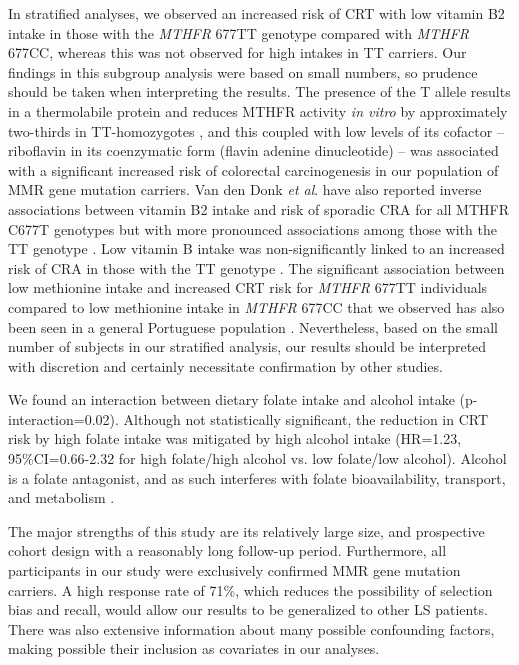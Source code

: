 \noindent In stratified analyses, we observed an increased risk of CRT with low vitamin B2 intake in those with the \emph{MTHFR} 677TT genotype compared with \emph{MTHFR} 677CC, whereas this was not observed for high intakes in TT carriers. Our findings in this subgroup analysis were based on small numbers, so prudence should be taken when interpreting the results. The presence of the T allele results in a thermolabile protein and reduces MTHFR activity \emph{in vitro} by approximately two-thirds in TT-homozygotes \cite{c648}, and this coupled with low levels of its cofactor -- riboflavin in its coenzymatic form (flavin adenine dinucleotide) -- was associated with a significant increased risk of colorectal carcinogenesis in our population of MMR gene mutation carriers. Van den Donk \emph{et al}. have also reported inverse associations between vitamin B2 intake and risk of sporadic CRA for all MTHFR C677T genotypes but with more pronounced associations among those with the TT genotype \cite{c621}. Low vitamin 
B intake was non-significantly linked to an increased risk of CRA in those with the TT genotype \cite{c621}. The significant association between low methionine intake and increased CRT risk for \emph{MTHFR} 677TT individuals compared to low methionine intake in \emph{MTHFR} 677CC that we observed has also been seen in a general Portuguese population \cite{c649}. Nevertheless, based on the small number of subjects in our stratified analysis, our results should be interpreted with discretion and certainly necessitate confirmation by other studies.

\noindent We found an interaction between dietary folate intake and alcohol intake (p-interaction=0.02). Although not statistically significant, the reduction in CRT risk by high folate intake was mitigated by high alcohol intake (HR=1.23, 95\%CI=0.66-2.32 for high folate/high alcohol vs. low folate/low alcohol). Alcohol is a folate antagonist, and as such interferes with folate bioavailability, transport, and metabolism \cite{c650}.

\noindent The major strengths of this study are its relatively large size, and prospective cohort design with a reasonably long follow-up period. Furthermore, all participants in our study were exclusively confirmed MMR gene mutation carriers. A high response rate of 71\%, which reduces the possibility of selection bias and recall, would allow our results to be generalized to other LS patients. There was also extensive information about many possible confounding factors, making possible their inclusion as covariates in our analyses.

